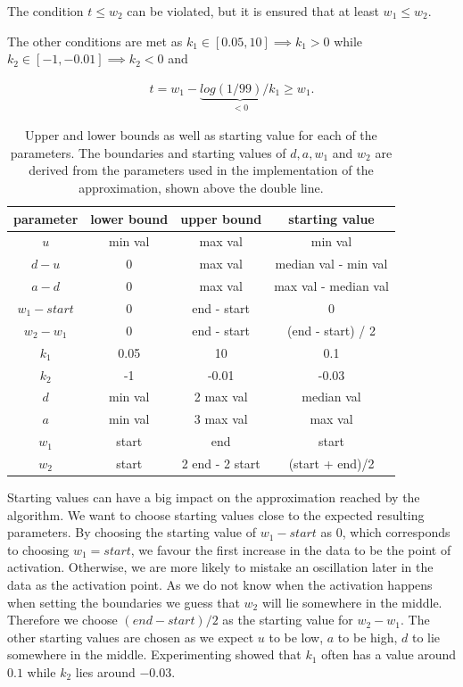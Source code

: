 The condition $t \leq w_2$ can be violated, but it is ensured that at least $w_1 \leq w_2$.

The other conditions are met as $k_1 \in [0.05, 10] \implies k_1 > 0$ while $k_2 \in [-1, -0.01] \implies k_2 < 0$ and

\begin{align*}
	t = w_1 - \underbrace{log(1/99) / k_1}_{< 0} \geq w_1.
\end{align*}

\begin{table}[h!]
	\centering
	\begin{tabular}{|c|c|c|c|}
		\hline
		\textbf{parameter} & \textbf{lower bound} & \textbf{upper bound} & \textbf{starting value} \\ 
		\hline
		$u$ & min val & max val & min val\\
		\hline
		$d - u$ & 0 & max val & median val - min val\\
		\hline
		$a - d$ & 0 & max val & max val - median val\\
		\hline
		$w_1 - start$ & 0 & end - start & 0\\
		\hline
		$w_2 - w_1$ & 0 & end - start & (end - start) / 2\\
		\hline
		$k_1$ & 0.05 & 10 & 0.1\\
		\hline
		$k_2$ & -1 & -0.01 & -0.03\\
		\hline
		\hline
		$d$ & min val & 2 max val & median val \\
		\hline
		$a$ & min val & 3 max val & max val \\
		\hline
		$w_1$ & start & end & start \\
		\hline
		$w_2$ & start & 2 end - 2 start & (start + end)/2\\
		\hline
	\end{tabular}
	\label{tab:boundaries_and_starting_vals}
	\caption{Upper and lower bounds as well as starting value for each of the parameters. The boundaries and starting values of $d, a, w_1$ and $w_2$ are derived from the parameters used in the implementation of the approximation, shown above the double line.}
\end{table}

Starting values can have a big impact on the approximation reached by the algorithm. We want to choose starting values close to the expected resulting parameters. By choosing the starting value of $w_1 - start$ as $0$, which corresponds to choosing $w_1 = start$, we favour the first increase in the data to be the point of activation. Otherwise, we are more likely to mistake an oscillation later in the data as the activation point. As we do not know when the activation happens when setting the boundaries we guess that $w_2$ will lie somewhere in the middle. Therefore we choose $(end - start)/2$ as the starting value for $w_2 - w_1$. The other starting values are chosen as we expect $u$ to be low, $a$ to be high, $d$ to lie somewhere in the middle. Experimenting showed that $k_1$ often has a value around $0.1$ while $k_2$ lies around $-0.03$.


